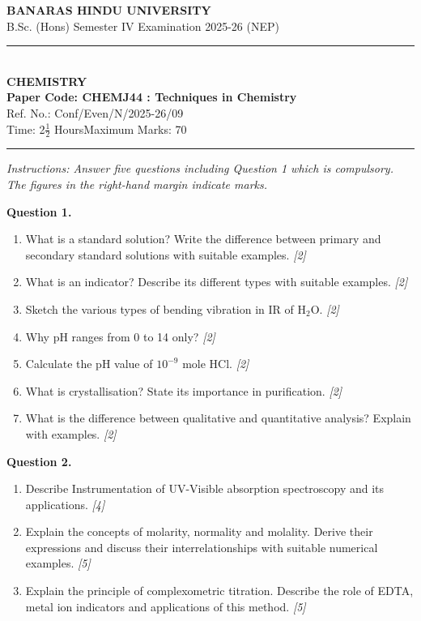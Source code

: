 \documentclass[11pt,a4paper]{article}
\newcommand{\pts}[1]{\hfill \textit{[#1]}}
\begin{document}
\begin{center}
  {\large\bfseries BANARAS HINDU UNIVERSITY}\\[2pt]
  {\normalsize B.Sc. (Hons) Semester IV Examination 2025-26 (NEP)}\\[6pt]
  \rule{0.8\linewidth}{0.5pt}\\[6pt]
  {\large\bfseries CHEMISTRY}\\[4pt]
  {\large\bfseries Paper Code: CHEMJ44 : Techniques in Chemistry}\\[2pt]
  {\small Ref. No.: Conf/Even/N/2025-26/09}\\[4pt]
  {\normalsize Time: 2$\frac{1}{2}$ Hours\hfill Maximum Marks: 70}
\end{center}

\rule{\linewidth}{0.4pt}

\smallskip

\noindent \textit{Instructions: Answer five questions including Question 1 which is compulsory. The figures in the right-hand margin indicate marks.}

\bigskip

\noindent \textbf{Question 1.}
\begin{enumerate}[label=(\alph*)]
  \item What is a standard solution? Write the difference between primary and secondary standard solutions with suitable examples. \pts{2}
  \item What is an indicator? Describe its different types with suitable examples. \pts{2}
  \item Sketch the various types of bending vibration in IR of $\text{H}_2\text{O}$. \pts{2}
  \item Why pH ranges from 0 to 14 only? \pts{2}
  \item Calculate the pH value of $10^{-9}\text{ mole HCl}$. \pts{2}
  \item What is crystallisation? State its importance in purification. \pts{2}
  \item What is the difference between qualitative and quantitative analysis? Explain with examples. \pts{2}
\end{enumerate}

\bigskip

\noindent \textbf{Question 2.}
\begin{enumerate}[label=(\alph*)]
  \item Describe Instrumentation of UV-Visible absorption spectroscopy and its applications. \pts{4}
  \item Explain the concepts of molarity, normality and molality. Derive their expressions and discuss their interrelationships with suitable numerical examples. \pts{5}
  \item Explain the principle of complexometric titration. Describe the role of EDTA, metal ion indicators and applications of this method. \pts{5}
\end{enumerate}
\end{document}
